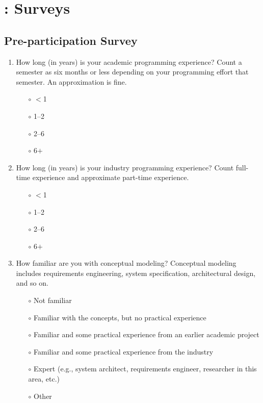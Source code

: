 \chapter{\frameworkA: Surveys}
\label{app:arnor-survey}


\section{Pre-participation Survey}
\label{appsec:presurvey}

\begin{enumerate}
\item How long (in years) is your academic programming experience? Count a semester as six months or less depending on your programming effort that semester. An approximation is fine.
\begin{itemize}
\item[$\circ$] $<$1
\item[$\circ$] 1--2
\item[$\circ$] 2--6
\item[$\circ$] 6$+$
\end{itemize}

\item How long (in years) is your industry programming experience? Count full-time experience and approximate part-time experience.
\begin{itemize}
\item[$\circ$] $<$1
\item[$\circ$] 1--2
\item[$\circ$] 2--6
\item[$\circ$] 6$+$
\end{itemize}

\item How familiar are you with conceptual modeling? Conceptual modeling includes requirements engineering, system specification, architectural design, and so on.
\begin{itemize}
\item[$\circ$] Not familiar
\item[$\circ$] Familiar with the concepts, but no practical experience
\item[$\circ$] Familiar and some practical experience from an earlier academic project
\item[$\circ$] Familiar and some practical experience from the industry
\item[$\circ$] Expert (e.g., system architect, requirements engineer, researcher in this area, etc.)
\item[$\circ$] Other
\end{itemize}

\end{enumerate}

